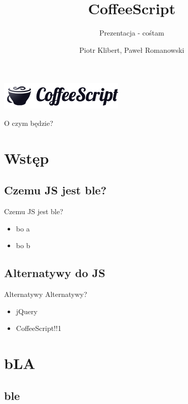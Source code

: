 \documentclass[xcolor=dvipsnames]{beamer}
\title{CoffeeScript}
\subtitle{Prezentacja - cośtam}
\author{Piotr Klibert, Paweł Romanowski}
\begin{document}
\begin{frame}[plain]
    \begin{center}
        \includegraphics[scale=0.25]{img/logo.png}
    \end{center}
    \titlepage
\end{frame}

\begin{frame}{O czym będzie?}
    \tableofcontents
\end{frame}

\section{Wstęp}
\subsection{Czemu JS jest ble?}

\begin{frame}[fragile]{Czemu JS jest ble?}
    \begin{itemize}
        \item bo a
        \item bo b
    \end{itemize}
\end{frame}

\subsection{Alternatywy do JS}
\begin{frame}[fragile]{Alternatywy}
    Alternatywy?

    \begin{itemize}
        \item jQuery
        \pause   %
        \item CoffeeScript!!1
    \end{itemize}
\end{frame}

\section{bLA}
\subsection{ble}
\end{document}
